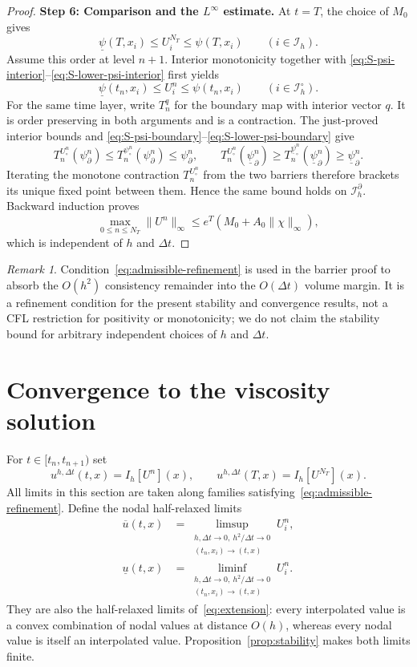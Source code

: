 \documentclass[11pt]{article}
\theoremstyle{definition}
\theoremstyle{remark}
\newtheorem{remark}[theorem]{Remark}
\newcommand{\dt}{\Delta t}
\begin{document}
\begin{proof}
		\medskip
		\noindent\textbf{Step 6: Comparison and the $L^\infty$ estimate.}
		At $t=T$, the choice of $M_0$ gives
		\[
		\underline\psi(T,x_i)\le U_i^{N_T}\le\psi(T,x_i)
		\qquad(i\in\mathcal I_h).
		\]
		Assume this order at level $n+1$.  Interior monotonicity together with
		\eqref{eq:S-psi-interior}--\eqref{eq:S-lower-psi-interior} first yields
		\[
		\underline\psi(t_n,x_i)\le U_i^n\le\psi(t_n,x_i)
		\qquad(i\in\mathcal I_h^\circ).
		\]
		For the same time layer, write $T_n^q$ for the boundary map with interior
		vector $q$.  It is order preserving in both arguments and is a contraction.
		The just-proved interior bounds and
		\eqref{eq:S-psi-boundary}--\eqref{eq:S-lower-psi-boundary} give
		\[
		T_n^{U_\circ^n}(\psi_\partial^n)
		\le T_n^{\psi_\circ^n}(\psi_\partial^n)\le\psi_\partial^n,
		\qquad
		T_n^{U_\circ^n}(\underline\psi_\partial^n)
		\ge T_n^{\underline\psi_\circ^n}(\underline\psi_\partial^n)
		\ge\underline\psi_\partial^n.
		\]
		Iterating the monotone contraction $T_n^{U_\circ^n}$ from the two barriers
		therefore brackets its unique fixed point between them.  Hence the same bound
		holds on $\mathcal I_h^\partial$.  Backward induction proves
		\[
		\max_{0\le n\le N_T}\|U^n\|_\infty
		\le e^T(M_0+A_0\|\chi\|_\infty),
		\]
		which is independent of $h$ and $\Delta t$.
	\end{proof}
	\begin{remark}\upshape
		Condition~\eqref{eq:admissible-refinement} is used in the barrier proof to
		absorb the $O(h^2)$ consistency remainder into the $O(\Delta t)$ volume
		margin.  It is a refinement condition for the present stability and
		convergence results, not a CFL restriction for positivity or monotonicity;
		we do not claim the stability bound for arbitrary independent choices of
		$h$ and $\Delta t$.
	\end{remark}
	\section{Convergence to the viscosity solution}
	\label{sec:convergence}
	
	For $t\in[t_n,t_{n+1})$ set
	\begin{equation}
		u^{h,\dt}(t,x)=I_h[U^n](x),
		\qquad
		u^{h,\dt}(T,x)=I_h[U^{N_T}](x).
		\label{eq:extension}
	\end{equation}
	All limits in this section are taken along families satisfying~\eqref{eq:admissible-refinement}.  Define the nodal half-relaxed limits
	\begin{align}
		\overline u(t,x)
		&=\limsup_{\substack{h,\dt\to0,\ h^2/\dt\to0\\
				(t_n,x_i)\to(t,x)}}U_i^n,
		\label{eq:upper-relaxed}\\
		\underline u(t,x)
		&=\liminf_{\substack{h,\dt\to0,\ h^2/\dt\to0\\
				(t_n,x_i)\to(t,x)}}U_i^n.
		\label{eq:lower-relaxed}
	\end{align}
	They are also the half-relaxed limits of~\eqref{eq:extension}: every interpolated value is a convex combination of nodal values at distance $O(h)$, whereas every nodal value is itself an interpolated value.  Proposition~\ref{prop:stability} makes both limits finite.
	
\end{document}
